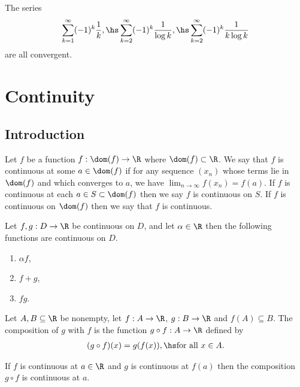 \documentclass{article}
\begin{document}
\begin{corollary}
	The series
	\begin{align*}
		\sum_{k=1}^\infty (-1)^k\frac{1}{k},\hs \sum_{k=2}^\infty (-1)^k\frac{1}{\log k},
		\hs \sum_{k=2}^\infty (-1)^k\frac{1}{k\log k}
	\end{align*}
	are all convergent.
\end{corollary}


\section{Continuity}


\subsection{Introduction}

\begin{definition}
	Let $f$ be a function $f:\dom(f)\to\R$ where $\dom(f)\subset\R$.
	We say that $f$ is continuous at some $a\in\dom(f)$ if for any
	sequence $(x_n)$ whose terms lie in $\dom(f)$ and which converges
	to $a$, we have $\lim_{n\to\infty}f(x_n)=f(a)$. If $f$ is continuous
	at each $a\in S\subset\dom(f)$ then we say $f$ is continuous on $S$.
	If $f$ is continuous on $\dom(f)$ then we say that $f$ is continuous.
\end{definition}

\setcounter{theorem}{2}
\begin{theorem}
	Let $f,g:D\to\R$ be continuous on $D$, and let $\alpha\in\R$ then the
	following functions are continuous on $D$.
	\begin{enumerate}
		\item $\alpha f$,
		\item $f+g$,
		\item $fg$.
	\end{enumerate}
\end{theorem}

\begin{definition}
	Let $A,B\subseteq \R$ be nonempty, let $f:A\to\R$, $g:B\to\R$ and
	$f(A)\subseteq B$. The composition of $g$ with $f$ is the function
	$g\circ f:A\to\R$ defined by
	\begin{align*}
		(g\circ f)(x) = g(f(x)),\hs\text{for all }x\in A.
	\end{align*}
\end{definition}

\begin{theorem}
	If $f$ is continuous at $a\in\R$ and $g$ is continuous at $f(a)$ then
	the composition $g\circ f$ is continuous at $a$.
\end{theorem}
\end{document}

